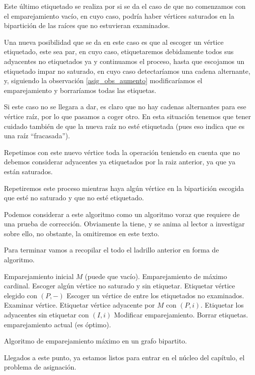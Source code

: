 Este último etiquetado se realiza por si se da el caso de que no comenzamos con el emparejamiento vacío, en cuyo caso, podría haber vértices saturados en la bipartición de las raíces que no estuvieran examinados.

Una nueva posibilidad que se da en este caso es que al escoger un vértice etiquetado, este sea par, en cuyo caso, etiquetaremos debidamente todos sus adyacentes no etiquetados ya y continuamos el proceso, hasta que escojamos un etiquetado impar no saturado, en cuyo caso detectaríamos una cadena alternante, y, siguiendo la observación \ref{asig_obs_aumento} modificaríamos el emparejamiento y borraríamos todas las etiquetas.

Si este caso no se llegara a dar, es claro que no hay cadenas alternantes para ese vértice raíz, por lo que pasamos a coger otro. En esta situación tenemos que tener cuidado también de que la nueva raíz no esté etiquetada (pues eso indica que es una raíz ``fracasada'').

Repetimos con este nuevo vértice toda la operación teniendo en cuenta que no debemos considerar adyacentes ya etiquetados por la raiz anterior, ya que ya están saturados.

Repetiremos este proceso mientras haya algún vértice en la bipartición escogida que esté no saturado y que no esté etiquetado.
\begin{obs}[Voraz]
	Podemos considerar a este algoritmo como un algoritmo voraz que requiere de una prueba de corrección. Obviamente la tiene, y se anima al lector a investigar sobre ello, no obstante, la omitiremos en este texto.
\end{obs}
Para terminar vamos a recopilar el todo el ladrillo anterior en forma de algoritmo.
\begin{algorithm}[H]
	\begin{algorithmic}[1]
		\REQUIRE Emparejamiento inicial $M$ (puede que vacío).
		\ENSURE Emparejamiento de máximo cardinal.
		\REPEAT
		\STATE Escoger algún vértice no saturado y sin etiquetar.
		\STATE Etiquetar vértice elegido con $(P,-)$
		\REPEAT
		\STATE Escoger un vértice de entre los etiquetados no examinados.
		\STATE Examinar vértice.
		\STATE Etiquetar vértice adyacente por $M$ con $(P,i)$. 
		\STATE Etiquetar los adyacentes sin etiquetar con $(I,i)$
		\ENDIF
		\STATE Modificar emparejamiento.
		\STATE Borrar etiquetas.
		\ENDIF
		\RETURN emparejamiento actual (es óptimo).
	\end{algorithmic}
	\caption{Algoritmo de emparejamiento máximo en un grafo bipartito.}\label{asig_alg_empMax}
\end{algorithm}
Llegados a este punto, ya estamos listos para entrar en el núcleo del capítulo, el problema de asignación.
